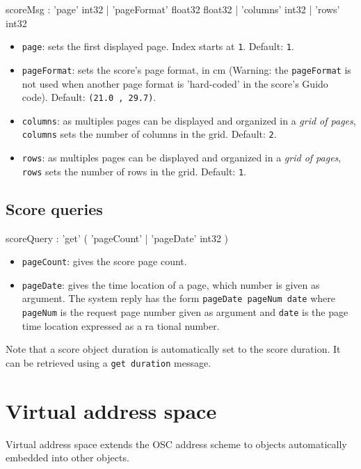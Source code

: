 \documentclass[a4paper,twoside]{report}
\newcommand{\toplevel}[1]	{\chapter{#1}}
\newcommand{\sublevel}[1]	{\section{#1}}
\newcommand{\OSC}[1]		{\texttt{#1}}
\newcommand{\values}[1]	{\texttt{#1}}
\begin{document}
\begin{rail}
scoreMsg : 	  'page' int32
				| 'pageFormat' float32 float32
				| 'columns' int32
				| 'rows' int32
\end{rail}

\begin{itemize}
\item \OSC{page}: sets the first displayed page. Index starts at \values{1}. Default: \values{1}.

\item \OSC{pageFormat}: sets the score's page format, in cm (Warning: the \OSC{pageFormat} is not used when another page format is 'hard-coded' in the score's Guido code). Default: \values{(21.0 , 29.7)}.

\item \OSC{columns}: as multiples pages can be displayed and organized in a \emph{grid of pages}, \OSC{columns} sets the number of columns in the grid. Default: \values{2}.

\item \OSC{rows}: as multiples pages can be displayed and organized in a \emph{grid of pages}, \OSC{rows} sets the number of rows in the grid. Default: \values{1}.
\end{itemize}

\sublevel{Score queries}
\label{guidoqueries}

\begin{rail}
scoreQuery : 	'get' (
				'pageCount'
			| 	'pageDate' int32
			)
\end{rail}

\begin{itemize}
\item \OSC{pageCount}: gives the score page count.
\item \OSC{pageDate}: gives the time location of a page, which number is given as argument. The system reply has the form \OSC{pageDate pageNum date} where \OSC{pageNum} is the request page number given as argument and \OSC{date} is the page time location expressed as a ra	tional number.
\end{itemize}

Note that a score object duration is automatically set to the score duration. It can be retrieved using a \OSC{get duration} message.


\toplevel{Virtual address space}

Virtual address space extends the OSC address scheme to objects automatically embedded into other objects. 
\end{document}

